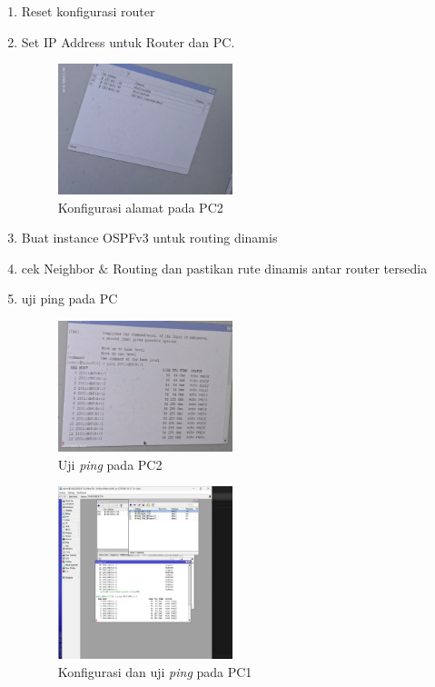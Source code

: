\begin{enumerate}
\item Reset konfigurasi router
\item Set IP Address untuk Router dan PC.
\begin{figure}[H]
    \centering
    \includegraphics[width=0.48\textwidth]{img/A4.jpg}
    \caption{Konfigurasi alamat pada PC2}
    \label{fig:a4}
\end{figure}

\item Buat instance OSPFv3 untuk routing dinamis
\item cek Neighbor $\&$ Routing dan pastikan rute dinamis antar router tersedia

\item uji ping pada PC
\begin{figure}[H]
    \centering
    \includegraphics[width=0.48\textwidth]{img/A5.jpeg}
    \caption{Uji \textit{ping} pada PC2}
    \label{fig:a5}
\end{figure}

\begin{figure}[H]
    \centering
    \includegraphics[width=0.48\textwidth]{img/A3.jpeg}
    \caption{Konfigurasi dan uji \textit{ping} pada PC1}
    \label{fig:a3}
\end{figure}
\end{enumerate}
\newpage
